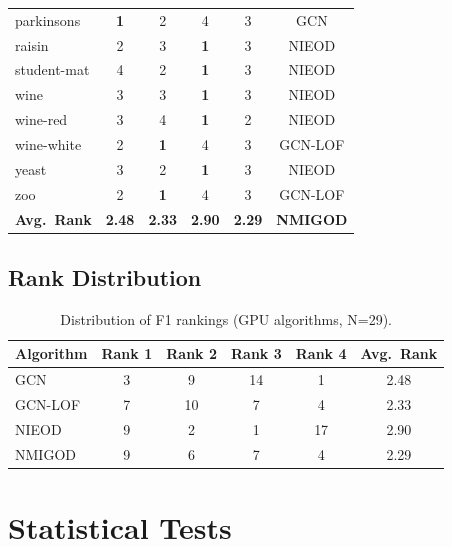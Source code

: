 \documentclass[11pt,a4paper]{article}
\begin{document}
\begin{table}[H]
\begin{tabular}{lcccc|c}
parkinsons & \textbf{1} & 2 & 4 & \cellcolor{red!10}3 & GCN \\
raisin & 2 & 3 & \textbf{1} & \cellcolor{red!10}3 & NIEOD \\
student-mat & 4 & 2 & \textbf{1} & \cellcolor{red!10}3 & NIEOD \\
wine & 3 & 3 & \textbf{1} & \cellcolor{red!10}3 & NIEOD \\
wine-red & 3 & 4 & \textbf{1} & \cellcolor{red!10}2 & NIEOD \\
wine-white & 2 & \textbf{1} & 4 & \cellcolor{red!10}3 & GCN-LOF \\
yeast & 3 & 2 & \textbf{1} & \cellcolor{red!10}3 & NIEOD \\
zoo & 2 & \textbf{1} & 4 & \cellcolor{red!10}3 & GCN-LOF \\
\midrule
\textbf{Avg.\ Rank} & \textbf{2.48} & \textbf{2.33} & \textbf{2.90} & \textbf{2.29} & \textbf{NMIGOD} \\
\bottomrule\end{tabular}\end{table}

\subsection{Rank Distribution}
\begin{table}[H]\centering\caption{Distribution of F1 rankings (GPU algorithms, N=29).}\label{tab:rankdist}\small
\begin{tabular}{lcccc|c}
\toprule
Algorithm & Rank 1 & Rank 2 & Rank 3 & Rank 4 & Avg.\ Rank \\
\midrule
GCN & 3 & 9 & 14 & 1 & 2.48 \\
GCN-LOF & 7 & 10 & 7 & 4 & 2.33 \\
NIEOD & 9 & 2 & 1 & 17 & 2.90 \\
NMIGOD & 9 & 6 & 7 & 4 & 2.29 \\
\bottomrule\end{tabular}\end{table}

\section{Statistical Tests}
\end{document}

